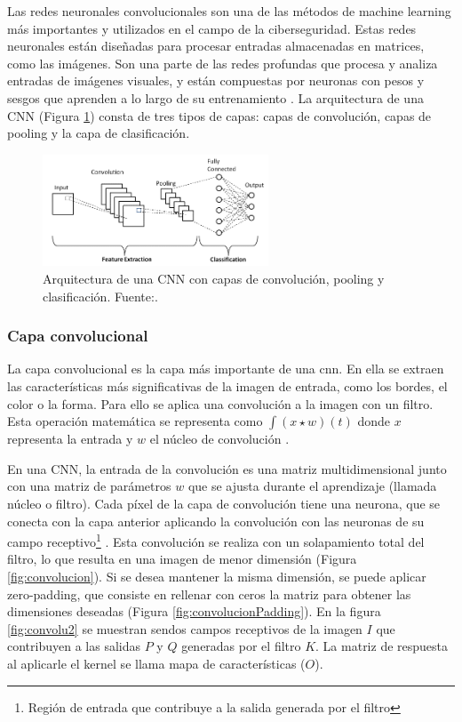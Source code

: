 Las redes neuronales convolucionales son una de las métodos de machine learning más importantes y utilizados en el campo de la ciberseguridad. Estas redes neuronales están diseñadas para procesar entradas almacenadas en matrices, como las imágenes.  Son una parte de las redes profundas que procesa y analiza entradas de imágenes visuales, y están compuestas por neuronas con pesos y sesgos que aprenden a lo largo de su entrenamiento \citep{podder2021artificial}. La arquitectura de una CNN (Figura \ref{fig:cnn_architecture}) consta de tres tipos de capas: capas de convolución, capas de pooling y la capa de clasificación. 
 

\begin{figure}[h]
    \centering
    \includegraphics[width=0.6\textwidth]{img/convlayers.png}
    \caption{Arquitectura de una CNN con capas de convolución, pooling y clasificación. Fuente:\citep{phung2018deep}.}
    \label{fig:cnn_architecture}
\end{figure}

\subsubsection*{Capa convolucional}

La capa convolucional es la capa más importante de una \acrshort{cnn}. En ella se extraen las características más significativas de la imagen de entrada, como los bordes, el color o la forma. Para ello se aplica una convolución a la imagen con un filtro. Esta operación matemática se representa como \( \int (x \star w)(t) \) donde $x$ representa la entrada y $w$ el núcleo de convolución \citep{pajares2021aprendizaje}.


En una CNN, la entrada de la convolución es una matriz multidimensional junto con una matriz de parámetros $w$ que se ajusta durante el aprendizaje (llamada núcleo o filtro). Cada píxel de la capa de convolución tiene una neurona, que se conecta con la capa anterior aplicando la convolución con las neuronas de su campo receptivo\footnote{Región de entrada que contribuye a la salida generada por el filtro} \cite{geron2022hands}. Esta convolución se realiza con un solapamiento total del filtro, lo que resulta en una imagen de menor dimensión (Figura \ref{fig:convolucion}). Si se desea mantener la misma dimensión, se puede aplicar zero-padding, que consiste en rellenar con ceros la matriz para obtener las dimensiones deseadas (Figura \ref{fig:convolucionPadding}). En la figura \ref{fig:convolu2} se muestran sendos campos receptivos de la imagen \( I \) que contribuyen a las salidas \( P \) y \( Q \) generadas por el filtro \( K \). La matriz de respuesta al aplicarle el kernel se llama mapa de características ($O$).


